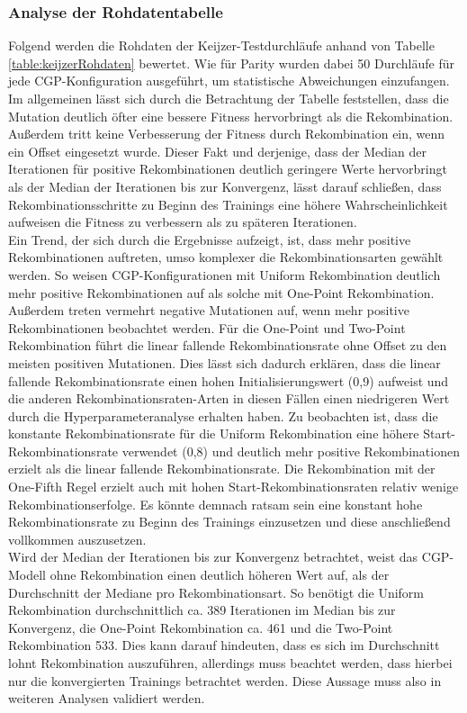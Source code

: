 \subsubsection{Analyse der Rohdatentabelle}
Folgend werden die Rohdaten der Keijzer-Testdurchläufe anhand von Tabelle \ref{table:keijzerRohdaten} bewertet.
Wie für Parity wurden dabei 50 Durchläufe für jede CGP-Konfiguration ausgeführt, um statistische Abweichungen einzufangen.
Im allgemeinen lässt sich durch die Betrachtung der Tabelle feststellen, dass die Mutation deutlich öfter eine bessere Fitness hervorbringt als die Rekombination.
Außerdem tritt keine Verbesserung der Fitness durch Rekombination ein, wenn ein Offset eingesetzt wurde.
Dieser Fakt und derjenige, dass der Median der Iterationen für positive Rekombinationen deutlich geringere Werte hervorbringt als der Median der Iterationen bis zur Konvergenz, lässt darauf schließen, dass Rekombinationsschritte zu Beginn des Trainings eine höhere Wahrscheinlichkeit aufweisen die Fitness zu verbessern als zu späteren Iterationen.\\
Ein Trend, der sich durch die Ergebnisse aufzeigt, ist, dass mehr positive Rekombinationen auftreten, umso komplexer die Rekombinationsarten gewählt werden.
So weisen CGP-Konfigurationen mit Uniform Rekombination deutlich mehr positive Rekombinationen auf als solche mit One-Point Rekombination.
Außerdem treten vermehrt negative Mutationen auf, wenn mehr positive Rekombinationen beobachtet werden.
Für die One-Point und Two-Point Rekombination führt die linear fallende Rekombinationsrate ohne Offset zu den meisten positiven Mutationen.
Dies lässt sich dadurch erklären, dass die linear fallende Rekombinationsrate einen hohen Initialisierungswert (0,9) aufweist und die anderen Rekombinationsraten-Arten in diesen Fällen einen niedrigeren Wert durch die Hyperparameteranalyse erhalten haben.
Zu beobachten ist, dass die konstante Rekombinationsrate für die Uniform Rekombination eine höhere Start-Rekombinationsrate verwendet (0,8) und deutlich mehr positive Rekombinationen erzielt als die linear fallende Rekombinationsrate.
Die Rekombination mit der One-Fifth Regel erzielt auch mit hohen Start-Rekombinationsraten relativ wenige Rekombinationserfolge.
Es könnte demnach ratsam sein eine konstant hohe Rekombinationsrate zu Beginn des Trainings einzusetzen und diese anschließend vollkommen auszusetzen.\\
Wird der Median der Iterationen bis zur Konvergenz betrachtet, weist das CGP-Modell ohne Rekombination einen deutlich höheren Wert auf, als der Durchschnitt der Mediane pro Rekombinationsart. 
So benötigt die Uniform Rekombination durchschnittlich ca. 389 Iterationen im Median bis zur Konvergenz, die One-Point Rekombination ca. 461 und die Two-Point Rekombination 533.
Dies kann darauf hindeuten, dass es sich im Durchschnitt lohnt Rekombination auszuführen, allerdings muss beachtet werden, dass hierbei nur die konvergierten Trainings betrachtet werden.
Diese Aussage muss also in weiteren Analysen validiert werden.
